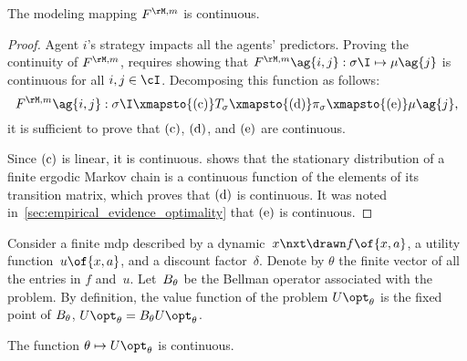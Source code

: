 \begin{proposition}
\label{res:modeling_continuity}
The modeling mapping \(\FM\) is continuous.
\end{proposition}

\begin{proof}
Agent \(i\)'s strategy impacts all the agents' predictors.
Proving the continuity of \(\FM\), requires showing that \(\FM\ag{i, j}: \sigma\I \mapsto \mu\ag{j}\) is continuous for all \(i, j \in \cI\).
Decomposing this function as follows:
\[\FM\ag{i, j}: \sigma\I \xmapsto{\subfunc{c}} T\strat{\sigma} \xmapsto{\subfunc{d}} \pi\strat{\sigma} \xmapsto{\subfunc{e}} \mu\ag{j},
\]
it is sufficient to prove that \(\mathrm{(c)}\), \(\mathrm{(d)}\), and \(\mathrm{(e)}\) are continuous.

Since \(\mathrm{(c)}\) is linear, it is continuous.
\cite[Theorem~4.1]{meyer:1980} shows that the stationary distribution of a finite ergodic Markov chain is a continuous function of the elements of its transition matrix, which proves that \(\mathrm{(d)}\) is continuous.
It was noted in~\cref{sec:empirical_evidence_optimality} that \(\mathrm{(e)}\) is continuous.
\end{proof}

\begin{lemma}
\label{res:markov_continuity}
Consider a finite \ac{mdp} described by a dynamic~\(x\nxt \drawn f \of{x, a}\), a utility function~\(u \of{x, a}\), and a discount factor~\(\delta\).
Denote by \(\theta\) the finite vector of all the entries in \(f\) and~\(u\).
Let~\(B_{\theta}\) be the Bellman operator associated with the problem.
By definition, the value function of the problem \(\Utheta\) is the fixed point of \(B_{\theta}\), \(\Utheta = \Btheta \Utheta\).

The function \(\theta \mapsto \Utheta\) is continuous.
\end{lemma}

